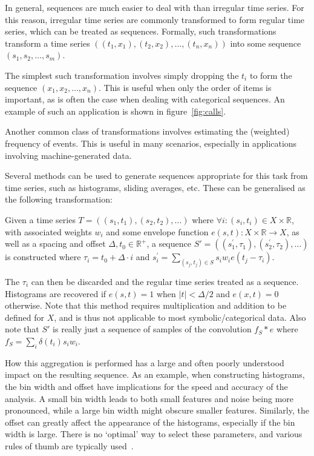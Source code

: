 In general, sequences are much easier to deal with than irregular time series. For this reason, irregular time series are commonly transformed to form regular time series, which can be treated as sequences. Formally, such transformations transform a time series $((t_1, x_1), (t_2, x_2), \ldots, (t_n, x_n))$ into some sequence $(s_1, s_2, \ldots, s_m)$.

The simplest such transformation involves simply dropping the $t_i$ to form the sequence $(x_1, x_2, \ldots, x_n)$. This is useful when only the order of items is important, as is often the case when dealing with categorical sequences. An example of such an application is shown in figure~\ref{fig:calls}.

Another common class of transformations involves estimating the (weighted) frequency of events. This is useful in many scenarios, especially in applications involving machine-generated data.

Several methods can be used to generate sequences appropriate for this task from time series, such as histograms, sliding averages, etc. These can be generalised as the following transformation:

Given a time series $T = ((s_1, t_1), (s_2, t_2), \dots)$ where $\forall i: (s_i, t_i) \in X \times \mathbb{R}$, with associated weights $w_i$ and some envelope function $e(s, t): X \times \mathbb{R} \rightarrow X$, as well as a spacing and offset $\Delta, t_0 \in \mathbb{R}^+$, a sequence $S' = ((s_{1}^{'}, \tau_1), (s_{2}^{'}, \tau_2), \dots)$ is constructed where $\tau_i = t_0 + \Delta \cdot i$ and $s_{i}^{'} = \sum_{(s_j, t_j) \in S} s_i w_i e(t_j - \tau_i)$.

The $\tau_i$ can then be discarded and the regular time series treated as a sequence. Histograms are recovered if $e(s, t) = 1$ when $|t| < \Delta/2$ and $e(x, t) = 0$ otherwise. Note that this method requires multiplication and addition to be defined for $X$, and is thus not applicable to most symbolic/categorical data. Also note that $S'$ is really just a sequence of samples of the convolution $f_S \ast e$ where $f_S = \sum_i \delta(t_i) s_i w_i$.

How this aggregation is performed has a large and often poorly understood impact on the resulting sequence. As an example, when constructing histograms, the bin width and offset have implications for the speed and accuracy of the analysis. A small bin width leads to both small features and noise being more pronounced, while a large bin width might obscure smaller features. Similarly, the offset can greatly affect the appearance of the histograms, especially if the bin width is large. There is no `optimal' way to select these parameters, and various rules of thumb are typically used~\cite{density_estimation}.

